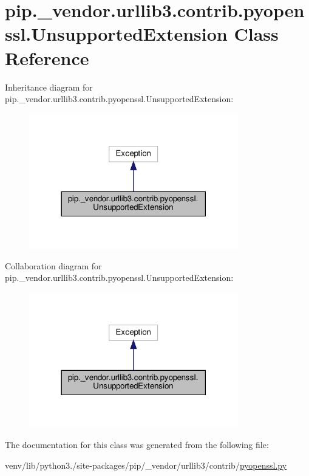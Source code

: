 \hypertarget{classpip_1_1__vendor_1_1urllib3_1_1contrib_1_1pyopenssl_1_1UnsupportedExtension}{}\section{pip.\+\_\+vendor.\+urllib3.\+contrib.\+pyopenssl.\+Unsupported\+Extension Class Reference}
\label{classpip_1_1__vendor_1_1urllib3_1_1contrib_1_1pyopenssl_1_1UnsupportedExtension}


Inheritance diagram for pip.\+\_\+vendor.\+urllib3.\+contrib.\+pyopenssl.\+Unsupported\+Extension\+:
\nopagebreak
\begin{figure}[H]
\begin{center}
\leavevmode
\includegraphics[width=258pt]{classpip_1_1__vendor_1_1urllib3_1_1contrib_1_1pyopenssl_1_1UnsupportedExtension__inherit__graph}
\end{center}
\end{figure}


Collaboration diagram for pip.\+\_\+vendor.\+urllib3.\+contrib.\+pyopenssl.\+Unsupported\+Extension\+:
\nopagebreak
\begin{figure}[H]
\begin{center}
\leavevmode
\includegraphics[width=258pt]{classpip_1_1__vendor_1_1urllib3_1_1contrib_1_1pyopenssl_1_1UnsupportedExtension__coll__graph}
\end{center}
\end{figure}


The documentation for this class was generated from the following file\+:\begin{DoxyCompactItemize}
\item 
venv/lib/python3./site-\/packages/pip/\+\_\+vendor/urllib3/contrib/\hyperlink{pyopenssl_8py}{pyopenssl.\+py}\end{DoxyCompactItemize}
